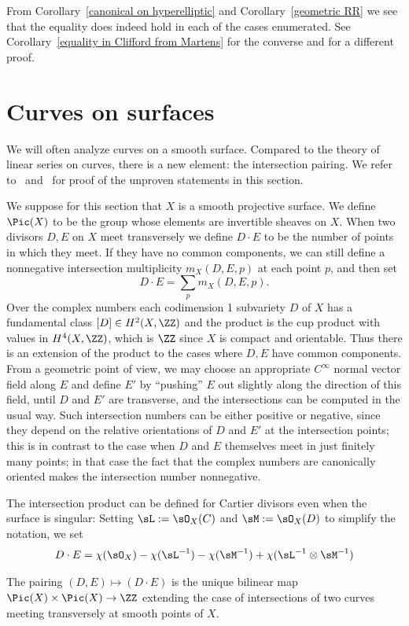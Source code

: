From Corollary~\ref{canonical on hyperelliptic} and Corollary~\ref{geometric RR} we see that the equality does indeed hold
in each of the cases enumerated. See
Corollary~\ref{equality in Clifford from Martens} for the converse and \cite[IV.5.4]{Hartshorne1977}
for a different proof.

 \section{Curves on surfaces}
 We will often analyze curves  on a smooth surface. Compared to the theory of linear series on curves, there is a new element: the intersection pairing. We refer to~\cite[Chapter V]{Hartshorne1977}
 and~\cite[Chapter I]{Beauville} for proof of the unproven statements in this section.
 
 We suppose for this section that $X$ is a smooth projective surface.
 We define $\Pic(X)$ to be the group whose elements are invertible sheaves on $X$.
When two divisors $D,E$ on $X$ meet transversely we define $D\cdot E$ to be the number of points in which they meet. If they have no common
components, we can still define a nonnegative intersection multiplicity $m_X(D,E,p)$ at each point $p$, and then set
$$
D\cdot E = \sum_p m_X(D,E,p).
$$
Over the complex numbers each codimension 1 subvariety $D$ of $X$ has a fundamental class
$[D]\in H^2(X, \ZZ)$ and the product is the cup product with values in $H^4(X,\ZZ)$, which is $\ZZ$ since $X$ is compact and orientable. Thus
there is an extension of the product to the cases where $D,E$ have common components. From a geometric point of view, we may choose an
appropriate $C^\infty$
normal vector field along $E$ and define $E'$ by ``pushing'' $E$ out slightly along the direction of this field, until $D$ and $E'$ are transverse,
and the intersections can be computed in the usual way. Such intersection numbers can be either positive or negative,
since they depend on the relative orientations of $D$ and $E'$ at the intersection points; this is in contrast to the case when $D$ and $E$
themselves meet in just finitely many points; in that case the fact that the complex numbers are canonically oriented makes the intersection number nonnegative.

The intersection product can be defined for Cartier divisors even when the surface is singular: Setting $\sL := \sO_X(C)$ and
$\sM := \sO_X(D)$ to simplify the notation, we set 
$$
D\cdot E = \chi(\sO_X)-\chi(\sL^{-1}) -\chi(\sM^{-1}) +\chi(\sL^{-1}\otimes \sM^{-1}) 
$$
\begin{theorem} The pairing $(D,E) \mapsto (D\cdot E)$ is the unique bilinear map
$\Pic(X) \times \Pic(X) \to \ZZ$ extending the case of intersections of two curves meeting transversely at smooth points of $X$. 
\end{theorem}

